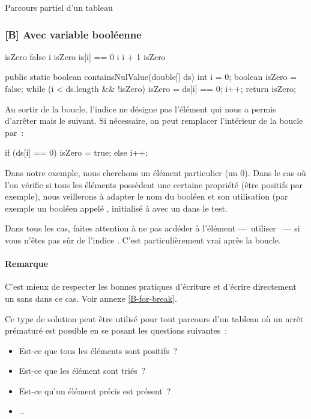 \begin{Fiche}{Parcours partiel d’un tableau}
	\subsubsection*{[B] Avec variable booléenne}

		\begin{pseudocode}
				\Let isZero \Gets false
				\Let i 
					\Let isZero \Gets is[i] ==  0
					\Let i \Gets i + 1
				\EndWhile
				\Return isZero
			\EndAlgo
		\end{pseudocode}

		\begin{java}
public static boolean containsNulValue(double[] ds){
	int i = 0;
	boolean isZero = false;
	while (i < ds.length && !isZero){
		isZero = ds[i] == 0;
		i++;
	}
	return isZero;
}
		\end{java}

		Au sortir de la boucle, l’indice  ne désigne pas l’élément qui
		nous a permis d’arrêter mais le suivant.  Si nécessaire, on peut
		remplacer l’intérieur de la boucle par~:

		\begin{java}
if (ds[i] == 0){
	isZero = true;
} else {
	i++;
}
		\end{java}
		
		Dans notre exemple, nous cherchons un élément particulier (un 0).  Dans
		le cas où l'on vérifie si tous les éléments possèdent une certaine
		propriété (être positifs par exemple), nous veillerons à adapter le nom
		du booléen et son utilisation (par exemple un booléen appelé
		, initialisé à  avec un  dans le test.

		Dans tous les cas, faites attention à ne pas acdéder à l'élément
		—~utiliser ~— si vous n’êtes pas sûr de l'indice .
		C’est particulièrement vrai après la boucle.

		\paragraph{Remarque} C'est mieux de respecter les bonnes pratiques
		d'écriture et d'écrire directement un  sans  dans ce
		cas.  Voir annexe \vref{B-for-break}.
		
					

	Ce type de solution peut être utilisé pour tout parcours d'un tableau où un
	arrêt prématuré est possible en se posant les questions suivantes~:

	\begin{itemize}
	\item Est-ce que tous les éléments sont positifs~?
	\item Est-ce que les élément sont triés~?
	\item Est-ce qu’un élément précis est présent~?
	\item \dots
	\end{itemize}
	
\end{Fiche}
